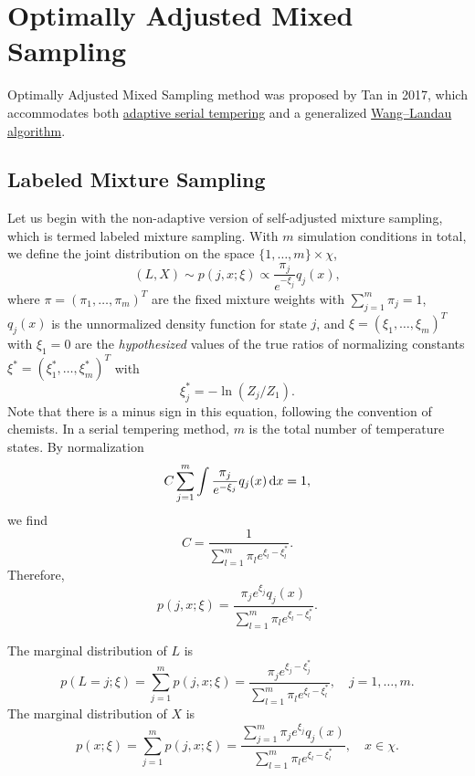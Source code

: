 \section{Optimally Adjusted Mixed Sampling\label{Sec:ES:OAMS}}
Optimally Adjusted Mixed Sampling method was proposed by Tan in 2017\cite{TanJCGS2017}, which accommodates both \hyperref[Sec:ES:ST]{adaptive serial tempering} and a generalized \hyperref[Sec:ES:Wang--Landau]{Wang--Landau algorithm}.

\subsection{Labeled Mixture Sampling}
Let us begin with the non-adaptive version of self-adjusted mixture sampling, which is termed labeled mixture sampling. With $m$ simulation conditions in total, we define the joint distribution on the space $\{1,\dots,m\}\times \chi$, 
\begin{equation}
     (L,X)\sim p(j,x;\xi)\propto \frac{\pi_j}{e^{-\xi_j}}q_j(x),
\end{equation}
where $\pi=(\pi_1,\dots,\pi_m)^T$ are the fixed mixture weights with $\sum_{j=1}^m \pi_j=1$, $q_j(x)$ is the unnormalized density function for state $j$, and $\xi=(\xi_1,\dots,\xi_m)^T$ with $\xi_1=0$ are the \textit{hypothesized} values of the true ratios of normalizing constants $\xi^\ast=(\xi_1^\ast,\dots,\xi_m^\ast)^T$ with 
\begin{equation}
    \xi_j^\ast=-\ln{(Z_j/Z_1)}.
\end{equation}
Note that there is a minus sign in this equation, following the convention of chemists.
In a serial tempering method, $m$ is the total number of temperature states. By normalization
\begin{equation}
    C\sum_{j=1}^m\int \frac{\pi_j}{e^{-\xi_j}}q_j(x)\mathop{}\!\mathrm{d} x=1,
\end{equation}
we find
\begin{equation}
    C=\frac{1}{\sum_{l=1}^m\pi_l e^{\xi_l-\xi_l^\ast}}.
\end{equation}
Therefore,
\begin{equation}
    p(j,x;\xi)=\frac{\pi_je^{\xi_j}q_j(x)}{\sum_{l=1}^m\pi_l e^{\xi_l-\xi_l^\ast}}.
    \label{eq:ES:OAMS:pjx}
\end{equation}

The marginal distribution of $L$ is
\begin{equation}
    p(L=j;\xi)=\sum_{j=1}^{m}p(j,x;\xi)=\frac{\pi_je^{\xi_j-\xi_j^\ast}}{\sum_{l=1}^m\pi_l e^{\xi_l-\xi_l^\ast}},\quad j=1,\dots,m.
\end{equation}
The marginal distribution of $X$ is
\begin{equation}
    p(x;\xi)=\sum_{j=1}^m p(j,x;\xi)=\frac{\sum_{j=1}^m\pi_je^{\xi_j}q_j(x)}{\sum_{l=1}^m\pi_l e^{\xi_l-\xi_l^\ast}},\quad x\in \chi.
\end{equation}

